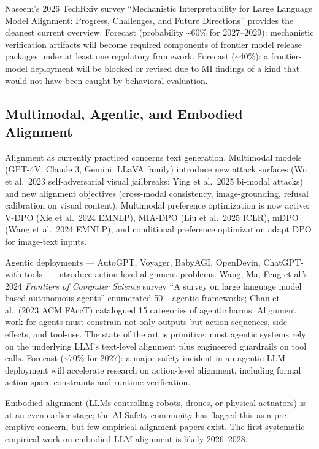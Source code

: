 Naseem's 2026 TechRxiv survey ``Mechanistic Interpretability for Large Language Model Alignment: Progress, Challenges, and Future Directions'' provides the cleanest current overview. Forecast (probability \textasciitilde60\% for 2027--2029): mechanistic verification artifacts will become required components of frontier model release packages under at least one regulatory framework. Forecast (\textasciitilde40\%): a frontier-model deployment will be blocked or revised due to MI findings of a kind that would not have been caught by behavioral evaluation.

\subsection{Multimodal, Agentic, and Embodied Alignment}\label{multimodal-agentic-and-embodied-alignment}

Alignment as currently practiced concerns text generation. Multimodal models (GPT-4V, Claude 3, Gemini, LLaVA family) introduce new attack surfaces (Wu et al.~2023 self-adversarial visual jailbreaks; Ying et al.~2025 bi-modal attacks) and new alignment objectives (cross-modal consistency, image-grounding, refusal calibration on visual content). Multimodal preference optimization is now active: V-DPO (Xie et al.~2024 EMNLP), MIA-DPO (Liu et al.~2025 ICLR), mDPO (Wang et al.~2024 EMNLP), and conditional preference optimization adapt DPO for image-text inputs.

Agentic deployments --- AutoGPT, Voyager, BabyAGI, OpenDevin, ChatGPT-with-tools --- introduce action-level alignment problems. Wang, Ma, Feng et al.'s 2024 \emph{Frontiers of Computer Science} survey ``A survey on large language model based autonomous agents'' enumerated 50+ agentic frameworks; Chan et al.~(2023 ACM FAccT) catalogued 15 categories of agentic harms. Alignment work for agents must constrain not only outputs but action sequences, side effects, and tool-use. The state of the art is primitive: most agentic systems rely on the underlying LLM's text-level alignment plus engineered guardrails on tool calls. Forecast (\textasciitilde70\% for 2027): a major safety incident in an agentic LLM deployment will accelerate research on action-level alignment, including formal action-space constraints and runtime verification.

Embodied alignment (LLMs controlling robots, drones, or physical actuators) is at an even earlier stage; the AI Safety community has flagged this as a pre-emptive concern, but few empirical alignment papers exist. The first systematic empirical work on embodied LLM alignment is likely 2026--2028.

